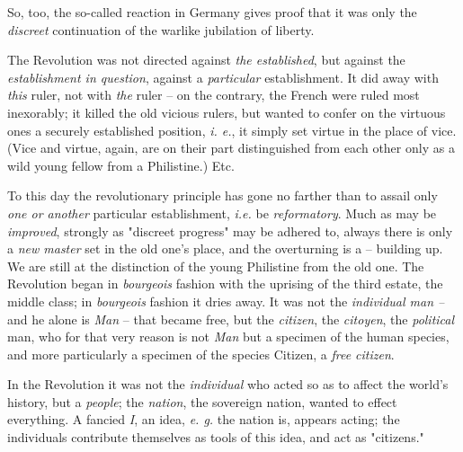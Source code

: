 So, too, the so-called reaction in Germany gives proof that it was only the 
\textit{discreet} continuation of the warlike jubilation of liberty.

The Revolution was not directed against \textit{the established}, but against 
the \textit{establishment in question}, against a \textit{particular} 
establishment. It did away with \textit{this} ruler, not with \textit{the} 
ruler -- on the contrary, the French were ruled most inexorably; it killed the 
old vicious rulers, but wanted to confer on the virtuous ones a securely 
established position, \textit{i. e.}, it simply set virtue in the place of 
vice. (Vice and virtue, again, are on their part distinguished from each other 
only as a wild young fellow from a Philistine.) Etc.

To this day the revolutionary principle has gone no farther than to assail 
only \textit{one or another} particular establishment, \textit{i.e.} be 
\textit{reformatory}. Much as may be \textit{improved}, strongly as 
"{}discreet progress"{} may be adhered to, always there is only a \textit{new 
master} set in the old one's place, and the overturning is a -- building up. 
We are still at the distinction of the young Philistine from the old one. The 
Revolution began in \textit{bourgeois} fashion with the uprising of the third 
estate, the middle class; in \textit{bourgeois} fashion it dries away. It was 
not the \textit{individual man --} and he alone is \textit{Man} -- that became 
free, but the \textit{citizen}, the \textit{citoyen}, the \textit{political} 
man, who for that very reason is not \textit{Man} but a specimen of the human 
species, and more particularly a specimen of the species Citizen, a 
\textit{free citizen}.

In the Revolution it was not the \textit{individual} who acted so as to affect 
the world's history, but a \textit{people}; the \textit{nation}, the sovereign 
nation, wanted to effect everything. A fancied \textit{I}, an idea, \textit{e. 
g.} the nation is, appears acting; the individuals contribute themselves as 
tools of this idea, and act as "{}citizens."{}

